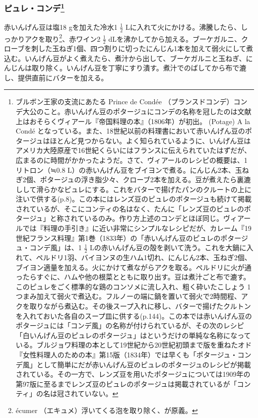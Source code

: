 \begin{recette}
{\subsubsection[ピュレ・コンデ]{\texorpdfstring{ピュレ・コンデ\footnote{ブルボン王家の支流にあたる
  Prince de Condée
  （プランスドコンデ）コンデ大公のこと。赤いんげん豆のポタージュにコンデの名称を冠したのは文献上はおそらくヴィアール『帝国料理の本』（1806年）が初出。
  (Potage) A la Condé
  となっている。また、18世紀以前の料理書において赤いんげん豆のポタージュはほとんど見つからない。よく知られているように、いんげん豆はアメリカ大陸原産で16世紀くらいにはフランスに伝えられていたはずだが、広まるのに時間がかかったようだ。さて、ヴィアールのレシピの概要は、1リトロン（≒0.8
  L）の赤いんげん豆をブイヨンで煮る。にんじん2本、玉ねぎ2個、ポタージュの浮き脂少々、クローブ2本を加える。豆が煮えたら裏漉しして滑らかなピュレにする。これをバターで揚げたパンのクルートの上に注いで供する(p.8)。この本にはレンズ豆のピュレのポタージュも続けて掲載されているが、そこにコンティの名はなく、たんに「レンズ豆のピュレのポタージュ」と称されているのみ。作り方上述のコンデとほぼ同じ。ヴィアールでは『料理の手引き』に近い非常にシンプルなレシピだが、カレーム『19世紀フランス料理』第1巻（1833年）の「赤いんげん豆のピュレのポタージュ・コンデ風」は、1
  \(\frac{1}{2}\)
  Lの赤いんげん豆の殻を剥いて洗う。これを大鍋に入れて、ペルドリ1羽、バイヨンヌの生ハム1切れ、にんじん2本、玉ねぎ2個、ブイヨン適量を加える。火にかけて煮ながらアクを取る。ペルドリに火が通ったらすぐに、ハムや他の根菜とともに取り出す。豆は煮汁ごと布で漉す。このピュレをごく標準的な鶏のコンソメに流し入れ、粗く砕いたこしょう
  1つまみ加えて弱火で煮込む。フルノーの端に鍋を置いて弱火で2時間程、アクを取りながら煮込む。その後スープ入れに移し、バターで揚げたクルトンを入れておいた各自のスープ皿に供する(p.144)。この本では赤いんげん豆のポタージュには「コンデ風」の名称が付けられているが、その次のレシピ「白いんげん豆のピュレのポタージュ」はというだけの単純な名称になっている。ブルジョワ料理の本として19世紀から20世紀初頭まで版を重ねたオド『女性料理人のための本』第15版（1834年）では早くも「ポタージュ・コンデ風」として簡単にだが赤いんげん豆のピュレのポタージュのレシピが掲載されている。その一方で、レンズ豆を用いたポタージュについては1909年の第97版に至るまでレンズ豆のピュレのポタージュは掲載されているが「コンティ」の名は冠されていない。}}{ピュレ・コンデ}}\label{puree-conde}}


赤いんげん豆は塩18 gを加えた冷水1 \(\frac{1}{2}\)
Lに入れて火にかける。沸騰したら、しっかりアクを取り\footnote{écumer
  （エキュメ）浮いてくる泡を取り除く、が原義。}、赤ワイン2
\(\frac{1}{2}\)
dLを沸かしてから加える。ブーケガルニ、クローブを刺した玉ねぎ1個、四つ割りに切ったにんじん1本を加えて弱火にして煮込む。いんげん豆がよく煮えたら、煮汁から出して、ブーケガルニと玉ねぎ、にんじんは取り除く。いんげん豆を丁寧にすり潰す。煮汁でのばしてから布で漉し、提供直前にバターを加える。


\end{recette}
